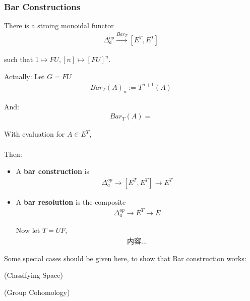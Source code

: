 \documentclass[Total.tex]{subfiles}
\begin{document}
			\subsubsection{Bar Constructions}
			\begin{Def}
				There is a stroing monoidal functor
				\begin{gather*}
					\Delta^{op}_a\stackrel{Bar_T}{\rightarrow} [E^T,E^T]
				\end{gather*}
				
				such that $1\mapsto FU,[n]\mapsto [FU]^n$. 
				
				Actually: Let $G=FU$
				\begin{gather*}
					Bar_T(A)_n:=T^{n+1}(A)
				\end{gather*}
				
				And:
				\begin{gather*}
					Bar_T(A)=
				\end{gather*}
			\end{Def}
			
			With evaluation for  $A\in E^T$,
			\begin{gather*}
				[E^T,E^T]
			\end{gather*}
			
			Then:
			\begin{Def}
				\begin{itemize}
					\item 
					A \textbf{bar construction} is
					\begin{gather*}
						\Delta_{a}^{op}\rightarrow [E^T,E^T]\rightarrow E^T
					\end{gather*}
					\item A \textbf{bar resolution} is the composite
					\begin{gather*}
						\Delta_a^{op}\rightarrow E^T\rightarrow E
					\end{gather*}
					
					Now let $T=UF$,
					\begin{gather*}
						内容...
					\end{gather*}
				\end{itemize}
			\end{Def}
			
			
			
			Some special cases should be given here, to show that Bar construction works:
			\begin{example}
				(Classifying Space)
			\end{example}
			
			\begin{example}
				(Group Cohomology)
			\end{example}
			
\end{document}
